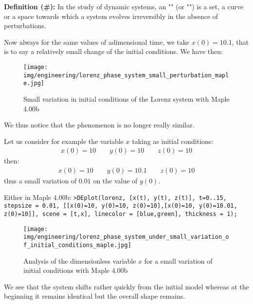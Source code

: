 	\textbf{Definition (\#\mydef):} In the study of dynamic systems, an "" (or "") is a set, a curve or a space towards which a system evolves irreversibly in the absence of perturbations.

	Now always for the same values of adimensional time, we take $x(0)=10.1$, that is to say a relatively small change of the initial conditions. We have then:
	\begin{figure}[H]
		\centering
		\texttt{[image: img/engineering/lorenz\_phase\_system\_small\_perturbation\_maple.jpg]}	
		\caption[]{Small variation in initial conditions of the Lorenz system with Maple 4.00b}
	\end{figure}
	We thus notice that the phenomenon is no longer really similar.

	Let us consider for example the variable $x$ taking as initial conditions:
	\begin{gather*}
		x(0)=10 \qquad y(0)=10 \qquad z(0)=10
	\end{gather*}
	then:
	\begin{gather*}
		x(0)=10 \qquad y(0)=10.1 \qquad z(0)=10
	\end{gather*}
	thus a small variation of $0.01$ on the value of $y(0)$.

	Either in Maple 4.00b:
	\texttt{>DEplot({lorenz}, [x(t), y(t), z(t)], t=0..15, stepsize = 0.01, [[x(0)=10, y(0)=10, z(0)=10],[x(0)=10, y(0)=10.01, z(0)=10]], scene = [t,x], linecolor = [blue,green], thickness = 1);}
	\begin{figure}[H]
		\centering
		\texttt{[image: img/engineering/lorenz\_phase\_system\_under\_small\_variation\_of\_initial\_conditions\_maple.jpg]}	
		\caption[]{Analysis of the dimensionless variable $x$ for a small variation of initial conditions with Maple 4.00b}
	\end{figure}
	We see that the system shifts rather quickly from the initial model whereas at the beginning it remains identical but the overall shape remains.


